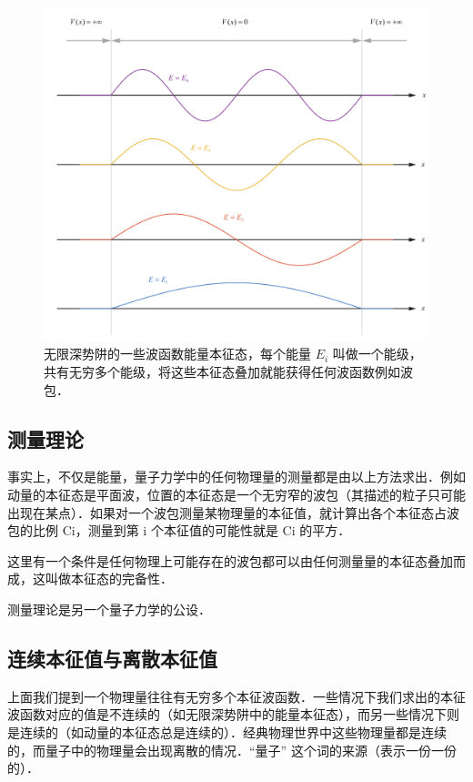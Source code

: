 
\begin{figure}[ht]
\centering
\includegraphics[width=14cm]{./figures/QM04.pdf}
\caption{无限深势阱的一些波函数能量本征态，每个能量 $E_i$ 叫做一个能级，共有无穷多个能级，将这些本征态叠加就能获得任何波函数例如波包．} \label{QM0_fig4}
\end{figure}

\subsection{测量理论}

事实上，不仅是能量，量子力学中的任何物理量的测量都是由以上方法求出．例如动量的本征态是平面波，位置的本征态是一个无穷窄的波包（其描述的粒子只可能出现在某点）．如果对一个波包测量某物理量的本征值，就计算出各个本征态占波包的比例 Ci，测量到第 i 个本征值的可能性就是 Ci 的平方．

这里有一个条件是任何物理上可能存在的波包都可以由任何测量量的本征态叠加而成，这叫做本征态的完备性．

测量理论是另一个量子力学的公设．

\subsection{连续本征值与离散本征值}
上面我们提到一个物理量往往有无穷多个本征波函数．一些情况下我们求出的本征波函数对应的值是不连续的（如无限深势阱中的能量本征态），而另一些情况下则是连续的（如动量的本征态总是连续的）．经典物理世界中这些物理量都是连续的，而量子中的物理量会出现离散的情况．“量子” 这个词的来源（表示一份一份的）．

